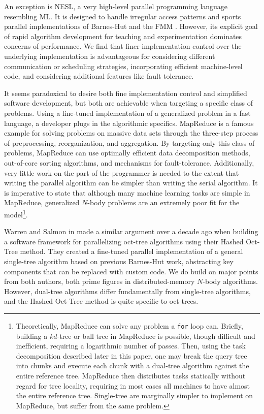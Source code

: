 \documentclass[twoside,leqno,twocolumn]{article}
\begin{document}
An exception is NESL, a very high-level parallel programming language resembling ML.
It is designed to handle irregular access patterns and sports parallel implementations of Barnes-Hut and the FMM \cite{blelloch_nbody}.
However, its explicit goal of rapid algorithm development for teaching and experimentation dominates concerns of performance.
We find that finer implementation control over the underlying implementation is advantageous for considering different communication or scheduling strategies, incorporating efficient machine-level code, and considering additional features like fault tolerance.

It seems paradoxical to desire both fine implementation control and simplified software development, but both are achievable when targeting a specific class of problems.
Using a fine-tuned implementation of a generalized problem in a fast language, a developer plugs in the algorithmic specifics.
MapReduce \cite{mapreduce} is a famous example for solving problems on massive data sets through the three-step process of preprocessing, reorganization, and aggregation.
By targeting only this class of problems, MapReduce can use optimally efficient data decomposition methods, out-of-core sorting algorithms, and mechanisms for fault-tolerance.
Additionally, very little work on the part of the programmer is needed to the extent that writing the parallel algorithm can be simpler than writing the serial algorithm.
It is imperative to state that although many machine learning tasks are simple in MapReduce, generalized $N$-body problems are an extremely poor fit for the model\footnote{
  Theoretically, MapReduce can solve any problem a {\tt for} loop can.
  Briefly, building a $kd$-tree or ball tree in MapReduce is possible, though difficult and inefficient, requiring a logarithmic number of passes.
  Then, using the task decomposition described later in this paper, one may break the query tree into chunks and execute each chunk with a dual-tree algorithm against the entire reference tree.
  MapReduce then distributes tasks statically without regard for tree locality, requiring in most cases all machines to have almost the entire reference tree.
  Single-tree are marginally simpler to implement on MapReduce, but suffer from the same problem.
  }.

Warren and Salmon in \cite{warren95portable} made a similar argument over a decade ago when building a software framework for parallelizing oct-tree algorithms using their Hashed Oct-Tree method.
They created a fine-tuned parallel implementation of a general single-tree algorithm based on previous Barnes-Hut work, abstracting key components that can be replaced with custom code.
We do build on major points from both authors, both prime figures in distributed-memory $N$-body algorithms.
However, dual-tree algorithms differ fundamentally from single-tree algorithms, and the Hashed Oct-Tree method is quite specific to oct-trees.
\end{document}
